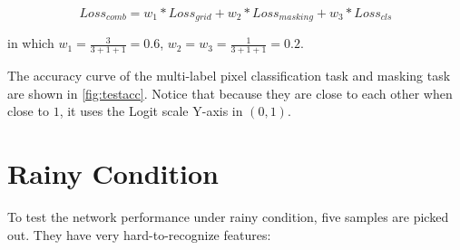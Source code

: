 \begin{spacing}{1.5}
\begin{equation}
\label{eq:combineloss}
    Loss_{comb}=w_1*{Loss_{grid}}+w_2*{Loss_{masking}}+w_3*{Loss_{cls}}
\end{equation}

in which $w_1=\frac{3}{3+1+1}=0.6$, $w_2=w_3=\frac{1}{3+1+1}=0.2$.


The accuracy curve of the multi-label pixel classification task and masking task are shown in \autoref{fig:testacc}. Notice that because they are close to each other when close to $1$, it uses the Logit scale Y-axis in $(0,1)$.

\section{Rainy Condition}
\label{sec:EX_rainy}

To test the network performance under rainy condition, five samples are picked out. They have very hard-to-recognize features: 


\end{spacing}
